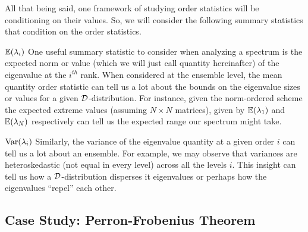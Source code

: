 

All that being said, one framework of studying order statistics will be conditioning on their values. So, we will consider the following summary statistics that condition on the order statistics. \newline


 $\mathbb{E}(\lambda_{i})$ One useful summary statistic to consider when analyzing a spectrum is the expected norm or value (which we will just call quantity hereinafter) of the eigenvalue at the $i^{th}$ rank.
When considered at the ensemble level, the mean quantity order statistic can tell us a lot about the bounds on the eigenvalue sizes or values for a given $\mathcal{D}$-distribution.
For instance, given the norm-ordered scheme the expected extreme values (assuming $N \times N$ matrices), given by $\mathbb{E}(\lambda_1)$ and $\mathbb{E}(\lambda_N)$ respectively can tell us the expected range our spectrum might take. \newline

\medskip

 $\text{Var}(\lambda_{i})$ Similarly, the variance of the eigenvalue quantity at a given order $i$ can tell us a lot about an ensemble. For example, we may observe that variances are heteroskedastic (not equal in every level) across all the levels $i$. This insight can tell us how a $\mathcal{D}$-distribution disperses it eigenvalues or perhaps how the eigenvalues ``repel'' each other.

\medskip


\newpage
\subsection{Case Study: Perron-Frobenius Theorem}

